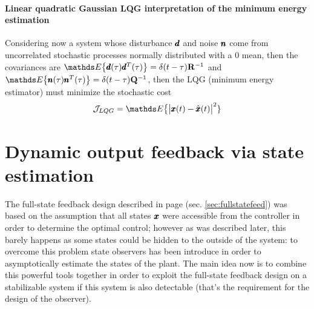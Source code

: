 	\paragraph{Linear quadratic Gaussian LQG interpretation of the minimum energy estimation} Considering now a system whose disturbance $\pmb{d}$ and noise $\pmb{n}$ come from uncorrelated stochastic processes normally distributed with a 0 mean, then the covariances are $\mathds E \big\{ \vet d(\tau)\vet d^T(\tau) \big\} = \delta(t-\tau) \R^{-1}$ and $\mathds E \big\{ \vet n(\tau)\vet n^T(\tau) \big\} = \delta(t-\tau) \Q^{-1}$, then the LQG (minimum energy estimator) must minimize the stochastic cost
	\begin{equation}
		\mathcal J_{LQG} = \mathds E\big\{ \big|\x(t) - \hat \x(t)\big|^2 \}
	\end{equation}
	
\section{Dynamic output feedback via state estimation}
	The full-state feedback design described in page \pageref{sec:fullstatefeed} (sec. \ref{sec:fullstatefeed}) was based on the assumption that all states $\pmb{x}$ were accessible from the controller in order to determine the optimal control; however as was described later, this barely happens as some states could be hidden to the outside of the system: to overcome this problem state observers has been introduce in order to asymptotically estimate the states of the plant. The main idea now is to combine this powerful tools together in order to exploit the full-state feedback design on a stabilizable system if this system is also detectable (that's the requirement for the design of the observer).
	
